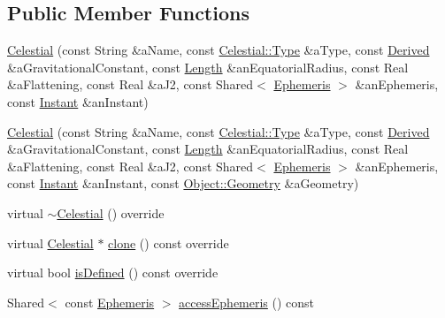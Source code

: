 \subsection*{Public Member Functions}
\begin{DoxyCompactItemize}
\item 
\hyperlink{classlibrary_1_1physics_1_1env_1_1obj_1_1_celestial_a86c385e43005598c96778d41cff5639e}{Celestial} (const String \&a\+Name, const \hyperlink{classlibrary_1_1physics_1_1env_1_1obj_1_1_celestial_aab1f58aa727e639288d65f3d33c4f245}{Celestial\+::\+Type} \&a\+Type, const \hyperlink{classlibrary_1_1physics_1_1units_1_1_derived}{Derived} \&a\+Gravitational\+Constant, const \hyperlink{classlibrary_1_1physics_1_1units_1_1_length}{Length} \&an\+Equatorial\+Radius, const Real \&a\+Flattening, const Real \&a\+J2, const Shared$<$ \hyperlink{classlibrary_1_1physics_1_1env_1_1_ephemeris}{Ephemeris} $>$ \&an\+Ephemeris, const \hyperlink{classlibrary_1_1physics_1_1time_1_1_instant}{Instant} \&an\+Instant)
\item 
\hyperlink{classlibrary_1_1physics_1_1env_1_1obj_1_1_celestial_a7ee6c55653113c71bf79d8c0d64878d7}{Celestial} (const String \&a\+Name, const \hyperlink{classlibrary_1_1physics_1_1env_1_1obj_1_1_celestial_aab1f58aa727e639288d65f3d33c4f245}{Celestial\+::\+Type} \&a\+Type, const \hyperlink{classlibrary_1_1physics_1_1units_1_1_derived}{Derived} \&a\+Gravitational\+Constant, const \hyperlink{classlibrary_1_1physics_1_1units_1_1_length}{Length} \&an\+Equatorial\+Radius, const Real \&a\+Flattening, const Real \&a\+J2, const Shared$<$ \hyperlink{classlibrary_1_1physics_1_1env_1_1_ephemeris}{Ephemeris} $>$ \&an\+Ephemeris, const \hyperlink{classlibrary_1_1physics_1_1time_1_1_instant}{Instant} \&an\+Instant, const \hyperlink{classlibrary_1_1physics_1_1env_1_1_object_a750fd821b17667fec9e0a4eda23af048}{Object\+::\+Geometry} \&a\+Geometry)
\item 
virtual \hyperlink{classlibrary_1_1physics_1_1env_1_1obj_1_1_celestial_a508a59c34ac23a582f2fed6003c4c907}{$\sim$\+Celestial} () override
\item 
virtual \hyperlink{classlibrary_1_1physics_1_1env_1_1obj_1_1_celestial}{Celestial} $\ast$ \hyperlink{classlibrary_1_1physics_1_1env_1_1obj_1_1_celestial_aaf8aa41a0ff9336eba62c07e3c27f82d}{clone} () const override
\item 
virtual bool \hyperlink{classlibrary_1_1physics_1_1env_1_1obj_1_1_celestial_a2b16a76f609891450356457de13c26d8}{is\+Defined} () const override
\item 
Shared$<$ const \hyperlink{classlibrary_1_1physics_1_1env_1_1_ephemeris}{Ephemeris} $>$ \hyperlink{classlibrary_1_1physics_1_1env_1_1obj_1_1_celestial_ab56fff3f2f1508dee79fa7410d67e300}{access\+Ephemeris} () const

\end{DoxyCompactItemize}
